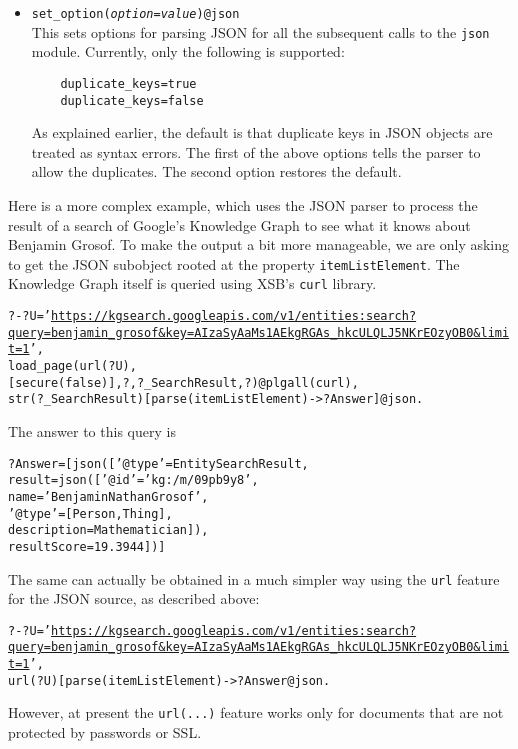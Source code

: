 \begin{itemize}
\item \texttt{set\_option(\emph{option}=\emph{value})@\bs{}json}\\
  This sets options for parsing JSON for all the subsequent calls to the
  \texttt{\bs{}json} module. Currently, only the following is supported:
\begin{verbatim}
    duplicate_keys=true
    duplicate_keys=false
\end{verbatim}
  As explained earlier, the default is that duplicate keys in JSON objects
  are treated as syntax errors. The first of the above options tells the
  parser to allow the duplicates. The second option restores the default.
\end{itemize}

Here is a more complex example, which uses the JSON parser to
process the result of a search of
Google's Knowledge Graph to see what it knows about Benjamin Grosof.
To make the output a bit more manageable, we are only asking to get the
JSON subobject rooted at the property \texttt{itemListElement}.
The Knowledge Graph itself is queried using XSB's \texttt{curl}
library. 
\begin{alltt}
?- ?U = '\url{https://kgsearch.googleapis.com/v1/entities:search?query=benjamin_grosof&key=AIzaSyAaMs1AEkgRGAs_hkcULQLJ5NKrEOzyOB0&limit=1}',
   load_page(url(?U),
             [secure(false)], ?, ?_SearchResult, ?)@\bs{}plgall(curl),
   str(?_SearchResult)[parse(itemListElement) -> ?Answer]@\bs{}json.
\end{alltt}
The answer to this query is
\begin{alltt}
?Answer = [json(['@type' = EntitySearchResult,
                 result = json(['@id' = 'kg:/m/09pb9y8',
                                name = 'Benjamin Nathan Grosof',
                                '@type' = [Person, Thing],
                                description = Mathematician]),
                 resultScore = 19.3944])]
\end{alltt}

The same can actually be obtained in a much simpler way using the
\texttt{url} feature for the JSON source, as described above:
\begin{alltt}
?- ?U = '\url{https://kgsearch.googleapis.com/v1/entities:search?query=benjamin_grosof&key=AIzaSyAaMs1AEkgRGAs_hkcULQLJ5NKrEOzyOB0&limit=1}',
   url(?U)[ parse(itemListElement) -> ?Answer @\bs{}json.
\end{alltt}
However, at present the \texttt{url(...)} feature works only for documents
that are not protected by passwords or SSL. 




